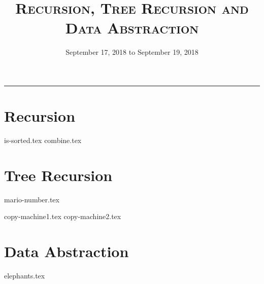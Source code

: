 \documentclass{exam}
\title{\textsc{Recursion, Tree Recursion and Data Abstraction}}
\date{September 17, 2018 to September 19, 2018}
\begin{document}
\maketitle
\rule{\textwidth}{0.15em}
\fontsize{12}{15}\selectfont


\section{Recursion}
\begin{questions}
{is-sorted.tex}
{combine.tex}
\end{questions}

\section{Tree Recursion}
\begin{questions}
{mario-number.tex}

{copy-machine1.tex}
{copy-machine2.tex}
\end{questions}


\section{Data Abstraction}
\begin{questions}
{elephants.tex}
\end{questions}
\end{document}
